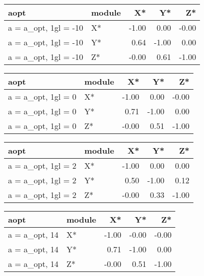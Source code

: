 \documentclass[10pt,a4paper]{article}
\begin{document}
\begin{table}[ht]
\centering
\begin{tabular}{llrrr}
  \hline
aopt & module & X* & Y* & Z* \\ 
  \hline
a = a\_opt, 1gl = -10 & X* & -1.00 & 0.00 & -0.00 \\ 
  a = a\_opt, 1gl = -10 & Y* & 0.64 & -1.00 & 0.00 \\ 
  a = a\_opt, 1gl = -10 & Z* & -0.00 & 0.61 & -1.00 \\ 
   \hline
\end{tabular}
\end{table}


\begin{table}[ht]
\centering
\begin{tabular}{llrrr}
  \hline
aopt & module & X* & Y* & Z* \\ 
  \hline
a = a\_opt, 1gl = 0 & X* & -1.00 & 0.00 & -0.00 \\ 
  a = a\_opt, 1gl = 0 & Y* & 0.71 & -1.00 & 0.00 \\ 
  a = a\_opt, 1gl = 0 & Z* & -0.00 & 0.51 & -1.00 \\ 
   \hline
\end{tabular}
\end{table}


\begin{table}[ht]
\centering
\begin{tabular}{llrrr}
  \hline
aopt & module & X* & Y* & Z* \\ 
  \hline
a = a\_opt, 1gl = 2 & X* & -1.00 & 0.00 & 0.00 \\ 
  a = a\_opt, 1gl = 2 & Y* & 0.50 & -1.00 & 0.12 \\ 
  a = a\_opt, 1gl = 2 & Z* & -0.00 & 0.33 & -1.00 \\ 
   \hline
\end{tabular}
\end{table}


\begin{table}[ht]
\centering
\begin{tabular}{llrrr}
  \hline
aopt & module & X* & Y* & Z* \\ 
  \hline
a = a\_opt, 14 & X* & -1.00 & -0.00 & -0.00 \\ 
  a = a\_opt, 14 & Y* & 0.71 & -1.00 & 0.00 \\ 
  a = a\_opt, 14 & Z* & -0.00 & 0.51 & -1.00 \\ 
   \hline
\end{tabular}
\end{table}
 
\end{document}
